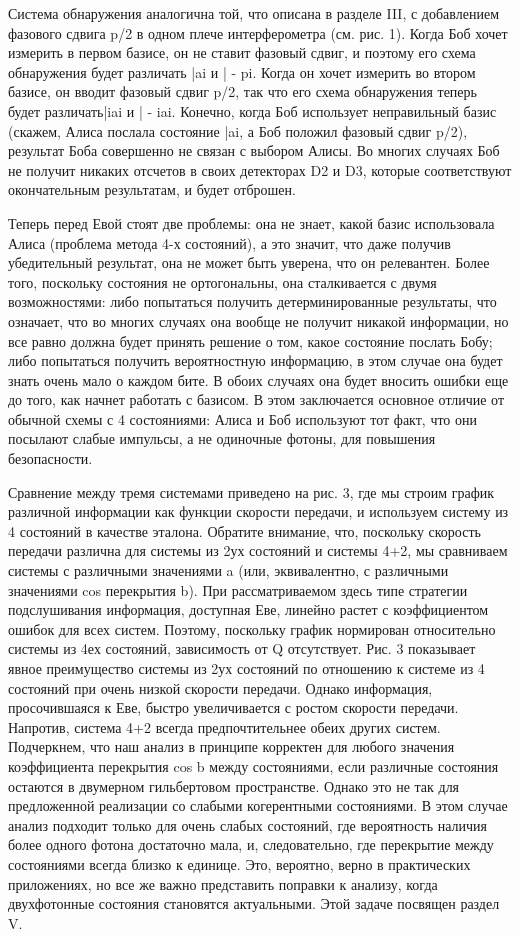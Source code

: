 Система обнаружения аналогична той, что описана в разделе III, с добавлением фазового сдвига p/2 в одном плече интерферометра (см. рис. 1). Когда Боб хочет измерить в первом базисе, он не ставит фазовый сдвиг, и поэтому его схема обнаружения будет различать |ai и | - pi. Когда он хочет измерить во втором базисе, он вводит фазовый сдвиг p/2, так что его схема обнаружения теперь будет различать|iai и | - iai. Конечно, когда Боб использует неправильный базис (скажем, Алиса послала состояние |ai, а Боб положил фазовый сдвиг p/2), результат Боба совершенно не связан с выбором Алисы. Во многих случаях Боб не получит никаких отсчетов в своих детекторах D2 и D3, которые соответствуют окончательным результатам, и будет отброшен.

Теперь перед Евой стоят две проблемы: она не знает, какой базис использовала Алиса (проблема метода 4-х состояний), а это значит, что даже получив убедительный результат, она не может быть уверена, что он релевантен. Более того, поскольку состояния не ортогональны, она сталкивается с двумя возможностями: либо попытаться получить детерминированные результаты, что означает, что во многих случаях она вообще не получит никакой информации, но все равно должна будет принять решение о том, какое состояние послать Бобу; либо попытаться получить вероятностную информацию, в этом случае она будет знать очень мало о каждом бите. В обоих случаях она будет вносить ошибки еще до того, как начнет работать с базисом. В этом заключается основное отличие от обычной схемы с 4 состояниями: Алиса и Боб используют тот факт, что они посылают слабые импульсы, а не одиночные фотоны, для повышения безопасности.

Сравнение между тремя системами приведено на рис. 3, где мы строим график различной информации как функции скорости передачи, и используем систему из 4 состояний в качестве эталона. Обратите внимание, что, поскольку скорость передачи различна для системы из 2ух состояний и системы 4+2, мы сравниваем системы с различными значениями a (или, эквивалентно, с различными значениями cos перекрытия b). При рассматриваемом здесь типе стратегии подслушивания информация, доступная Еве, линейно растет с коэффициентом ошибок для всех систем. Поэтому, поскольку график нормирован относительно системы из 4ех состояний, зависимость от Q отсутствует. Рис. 3 показывает явное преимущество системы из 2ух состояний по отношению к системе из 4 состояний при очень низкой скорости передачи. Однако информация, просочившаяся к Еве, быстро увеличивается с ростом скорости передачи. Напротив, система 4+2 всегда предпочтительнее обеих других систем. Подчеркнем, что наш анализ в принципе корректен для любого значения коэффициента перекрытия cos b между состояниями, если различные состояния остаются в двумерном гильбертовом пространстве. Однако это не так для предложенной реализации со слабыми когерентными состояниями. В этом случае анализ подходит только для очень слабых состояний, где вероятность наличия более одного фотона достаточно мала, и, следовательно, где перекрытие между состояниями всегда близко к единице. Это, вероятно, верно в практических приложениях, но все же важно представить поправки к анализу, когда двухфотонные состояния становятся актуальными. Этой задаче посвящен раздел V.

